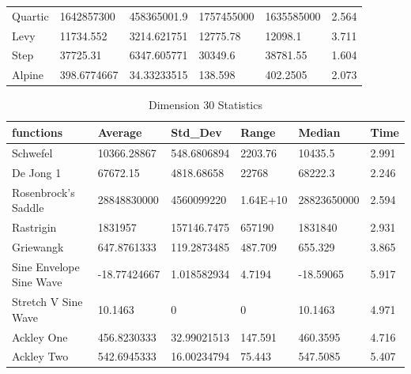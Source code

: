 \documentclass[12pt]{article}
\begin{document}
\begin{table}
\begin{tabular}{llllll}
				Quartic                 & 1642857300       & 458365001.9       & 1757455000     & 1635585000      & 2.564          \\
				Levy                    & 11734.552        & 3214.621751       & 12775.78       & 12098.1         & 3.711          \\
				Step                    & 37725.31         & 6347.605771       & 30349.6        & 38781.55        & 1.604          \\
				Alpine                  & 398.6774667      & 34.33233515       & 138.598        & 402.2505        & 2.073          \\
				\hline
			\end{tabular}
		\end{table}
	
	\newpage
	
	\begin{table}
		\centering
		\caption{Dimension 30 Statistics}
		\begin{tabular}{llllll} 
			\hline
			\textbf{functions}      & \textbf{Average} & \textbf{Std\_Dev} & \textbf{Range} & \textbf{Median} & \textbf{Time}  \\ 
			\hline
			Schwefel                & 10366.28867      & 548.6806894       & 2203.76        & 10435.5         & 2.991          \\
			De Jong 1               & 67672.15         & 4818.68658        & 22768          & 68222.3         & 2.246          \\
			Rosenbrock's Saddle     & 28848830000      & 4560099220        & 1.64E+10       & 28823650000     & 2.594          \\
			Rastrigin               & 1831957          & 157146.7475       & 657190         & 1831840         & 2.931          \\
			Griewangk               & 647.8761333      & 119.2873485       & 487.709        & 655.329         & 3.865          \\
			Sine Envelope Sine Wave & -18.77424667     & 1.018582934       & 4.7194         & -18.59065       & 5.917          \\
			Stretch V Sine Wave     & 10.1463          & 0                 & 0              & 10.1463         & 4.971          \\
			Ackley One              & 456.8230333      & 32.99021513       & 147.591        & 460.3595        & 4.716          \\
			Ackley Two              & 542.6945333      & 16.00234794       & 75.443         & 547.5085        & 5.407          \\

\end{tabular}
\end{table}
\end{document}

